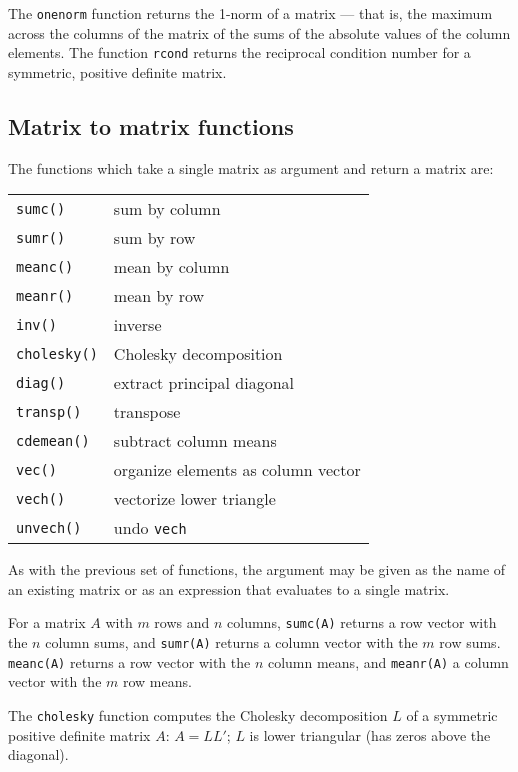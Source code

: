 The \texttt{onenorm} function returns the 1-norm of a matrix --- that
is, the maximum across the columns of the matrix of the sums of the
absolute values of the column elements.  The function \texttt{rcond}
returns the reciprocal condition number for a symmetric, positive
definite matrix.

\subsection{Matrix to matrix functions}
\label{matrix-to-matrix}

The functions which take a single matrix as argument and return a
matrix are:

\begin{center}
\begin{tabular}{ll}
\texttt{sumc()} & sum by column \\
\texttt{sumr()} & sum by row \\
\texttt{meanc()} & mean by column \\
\texttt{meanr()} & mean by row \\
\texttt{inv()} & inverse \\
\texttt{cholesky()} & Cholesky decomposition \\
\texttt{diag()} & extract principal diagonal \\
\texttt{transp()} & transpose \\
\texttt{cdemean()} & subtract column means \\ 
\texttt{vec()} & organize elements as column vector \\
\texttt{vech()} & vectorize lower triangle \\
\texttt{unvech()} & undo \texttt{vech}
\end{tabular}
\end{center}

As with the previous set of functions, the argument may be given as
the name of an existing matrix or as an expression that evaluates to a
single matrix.

For a matrix $A$ with $m$ rows and $n$ columns, \texttt{sumc(A)}
returns a row vector with the $n$ column sums, and \texttt{sumr(A)}
returns a column vector with the $m$ row sums.  \texttt{meanc(A)}
returns a row vector with the $n$ column means, and \texttt{meanr(A)}
a column vector with the $m$ row means.

The \texttt{cholesky} function computes the Cholesky decomposition $L$
of a symmetric positive definite matrix $A$: $A = LL'$; $L$ is lower
triangular (has zeros above the diagonal).  

